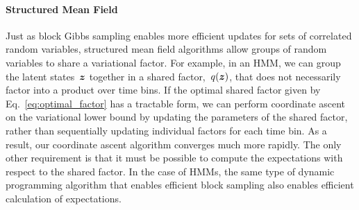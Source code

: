 \paragraph{Structured Mean Field}
Just as block Gibbs sampling enables more efficient updates for sets
of correlated random variables, structured mean field algorithms allow
groups of random variables to share a variational factor.  For
example, in an HMM, we can group the latent states~$\boldsymbol{z}$ together in a
shared factor,~$q(\boldsymbol{z})$, that does not necessarily factor into a
product over time bins.
If the optimal shared factor given by Eq.~\ref{eq:optimal_factor} has
a tractable form, we can perform coordinate ascent on the variational
lower bound by updating the parameters of the shared factor,
rather than sequentially updating individual factors for each time bin.
As a result, our coordinate ascent algorithm converges much more rapidly.
The only other requirement is that it must be possible to compute the
expectations with respect to the shared factor. In the case of HMMs,
the same type of dynamic programming algorithm that enables efficient
block sampling also enables efficient calculation of expectations. 

